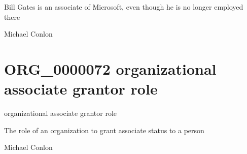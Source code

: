 \documentclass[letterpaper,10pt,english]{sphinxmanual}
\begin{document}
\begin{sphinxShadowBox}

\sphinxAtStartPar
Bill Gates is an associate of Microsoft, even though he is no longer employed there
\end{sphinxShadowBox}

\begin{sphinxShadowBox}

\sphinxAtStartPar
Michael Conlon 
\end{sphinxShadowBox}
\begin{quote}
\label{\detokenize{doc-ORG_0000072:org-0000072}}\label{\detokenize{doc-ORG_0000072:organizational-associate-grantor-role}}\label{\detokenize{doc-ORG_0000072:org-0000072}}
\ignorespaces \end{quote}


\section{ORG\_0000072 \sphinxhyphen{} organizational associate grantor role}
\label{\detokenize{doc-ORG_0000072:org-0000072-organizational-associate-grantor-role}}\label{\detokenize{doc-ORG_0000072:index-0}}\label{\detokenize{doc-ORG_0000072::doc}}
\begin{sphinxShadowBox}

\sphinxAtStartPar
organizational associate grantor role
\end{sphinxShadowBox}

\begin{sphinxShadowBox}

\sphinxAtStartPar
The role of an organization to grant associate status to a person
\end{sphinxShadowBox}

\begin{sphinxShadowBox}

\sphinxAtStartPar
Michael Conlon 
\end{sphinxShadowBox}
\end{document}
